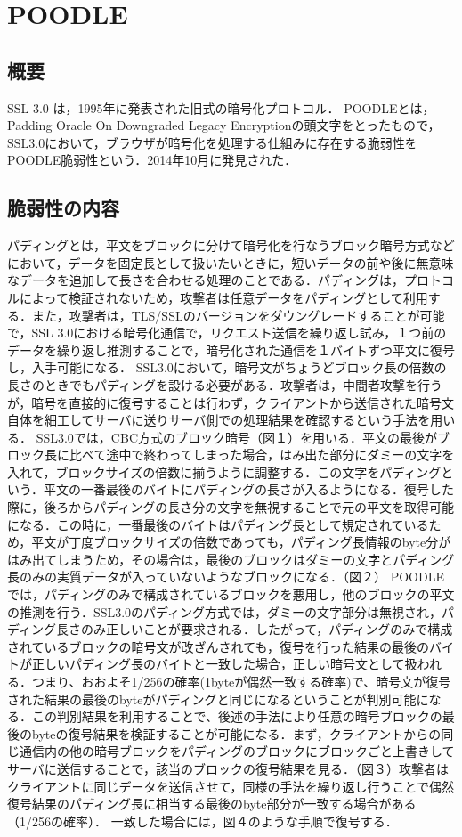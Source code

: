 \section{POODLE}

\subsection{概要}
SSL 3.0 は，1995年に発表された旧式の暗号化プロトコル．
POODLEとは，Padding Oracle On Downgraded Legacy Encryptionの頭文字をとったもので，SSL3.0において，ブラウザが暗号化を処理する仕組みに存在する脆弱性をPOODLE脆弱性という．2014年10月に発見された．

\subsection{脆弱性の内容}
パディングとは，平文をブロックに分けて暗号化を行なうブロック暗号方式などにおいて，データを固定長として扱いたいときに，短いデータの前や後に無意味なデータを追加して長さを合わせる処理のことである．パディングは，プロトコルによって検証されないため，攻撃者は任意データをパディングとして利用する．また，攻撃者は，TLS/SSLのバージョンをダウングレードすることが可能で，SSL 3.0における暗号化通信で，リクエスト送信を繰り返し試み，１つ前のデータを繰り返し推測することで，暗号化された通信を１バイトずつ平文に復号し，入手可能になる．\cite{mobage}
SSL3.0において，暗号文がちょうどブロック長の倍数の長さのときでもパディングを設ける必要がある．攻撃者は，中間者攻撃を行うが，暗号を直接的に復号することは行わず，クライアントから送信された暗号文自体を細工してサーバに送りサーバ側での処理結果を確認するという手法を用いる．
SSL3.0では，CBC方式のブロック暗号（図１）を用いる．平文の最後がブロック長に比べて途中で終わってしまった場合，はみ出た部分にダミーの文字を入れて，ブロックサイズの倍数に揃うように調整する．この文字をパディングという．平文の一番最後のバイトにパディングの長さが入るようになる．復号した際に，後ろからパディングの長さ分の文字を無視することで元の平文を取得可能になる．この時に，一番最後のバイトはパディング長として規定されているため，平文が丁度ブロックサイズの倍数であっても，パディング長情報のbyte分がはみ出てしまうため，その場合は，最後のブロックはダミーの文字とパディング長のみの実質データが入っていないようなブロックになる．（図２）
POODLEでは，パディングのみで構成されているブロックを悪用し，他のブロックの平文の推測を行う．SSL3.0のパディング方式では，ダミーの文字部分は無視され，パディング長さのみ正しいことが要求される．したがって，パディングのみで構成されているブロックの暗号文が改ざんされても，復号を行った結果の最後のバイトが正しいパディング長のバイトと一致した場合，正しい暗号文として扱われる．つまり、おおよそ1/256の確率(1byteが偶然一致する確率)で、暗号文が復号された結果の最後のbyteがパディングと同じになるということが判別可能になる．この判別結果を利用することで、後述の手法により任意の暗号ブロックの最後のbyteの復号結果を検証することが可能になる．まず，クライアントからの同じ通信内の他の暗号ブロックをパディングのブロックにブロックごと上書きしてサーバに送信することで，該当のブロックの復号結果を見る．（図３）攻撃者はクライアントに同じデータを送信させて，同様の手法を繰り返し行うことで偶然復号結果のパディング長に相当する最後のbyte部分が一致する場合がある（1/256の確率）．\cite{trend}
一致した場合には，図４のような手順で復号する．



